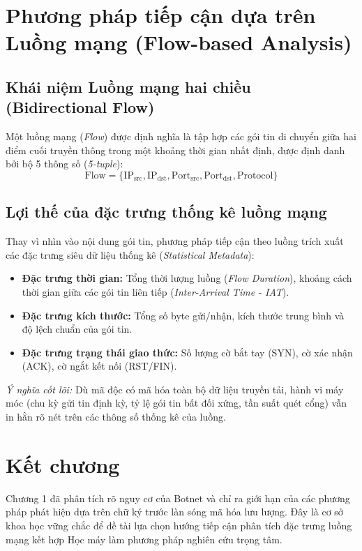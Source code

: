 \documentclass[12pt,a4paper,oneside]{report}
\begin{document}
\section{Phương pháp tiếp cận dựa trên Luồng mạng (Flow-based Analysis)}
\subsection{Khái niệm Luồng mạng hai chiều (Bidirectional Flow)}
Một luồng mạng (\textit{Flow}) được định nghĩa là tập hợp các gói tin di chuyển giữa hai điểm cuối truyền thông trong một khoảng thời gian nhất định, được định danh bởi bộ 5 thông số (\textit{5-tuple}):
\begin{equation}
  \text{Flow} = \{ \text{IP}_{\text{src}}, \text{IP}_{\text{dst}}, \text{Port}_{\text{src}}, \text{Port}_{\text{dst}}, \text{Protocol} \}
\end{equation}

\subsection{Lợi thế của đặc trưng thống kê luồng mạng}
Thay vì nhìn vào nội dung gói tin, phương pháp tiếp cận theo luồng trích xuất các đặc trưng siêu dữ liệu thống kê (\textit{Statistical Metadata}):
\begin{itemize}
  \item \textbf{Đặc trưng thời gian:} Tổng thời lượng luồng (\textit{Flow Duration}), khoảng cách thời gian giữa các gói tin liên tiếp (\textit{Inter-Arrival Time - IAT}).
  \item \textbf{Đặc trưng kích thước:} Tổng số byte gửi/nhận, kích thước trung bình và độ lệch chuẩn của gói tin.
  \item \textbf{Đặc trưng trạng thái giao thức:} Số lượng cờ bắt tay (SYN), cờ xác nhận (ACK), cờ ngắt kết nối (RST/FIN).
\end{itemize}
\textit{Ý nghĩa cốt lõi:} Dù mã độc có mã hóa toàn bộ dữ liệu truyền tải, hành vi máy móc (chu kỳ gửi tin định kỳ, tỷ lệ gói tin bất đối xứng, tần suất quét cổng) vẫn in hằn rõ nét trên các thông số thống kê của luồng.

\section{Kết chương}
Chương 1 đã phân tích rõ nguy cơ của Botnet và chỉ ra giới hạn của các phương pháp phát hiện dựa trên chữ ký trước làn sóng mã hóa lưu lượng. Đây là cơ sở khoa học vững chắc để đề tài lựa chọn hướng tiếp cận phân tích đặc trưng luồng mạng kết hợp Học máy làm phương pháp nghiên cứu trọng tâm.
\end{document}
